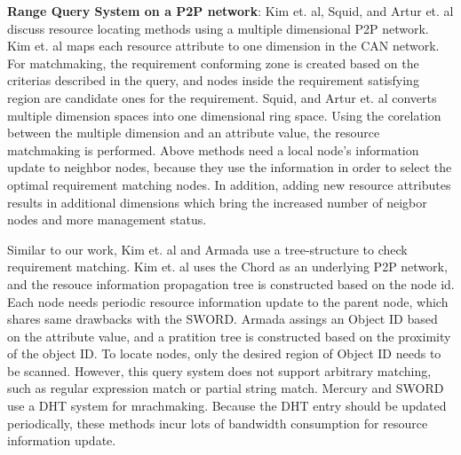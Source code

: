 \documentclass{acm_proc_article-sp}
\begin{document}
\textbf{Range Query System on a P2P network}: Kim et. al\cite{can_query}, Squid\cite{squid}, and Artur et. al\cite{query_for_grid} discuss resource locating methods using a multiple dimensional P2P network. 
Kim et. al\cite{can_query} maps each resource attribute to one dimension in the CAN network. For matchmaking, the requirement conforming zone is created based on the criterias described in the query, 
and nodes inside the requirement satisfying region are candidate ones for the requirement.
Squid\cite{squid}, and Artur et. al\cite{query_for_grid} converts multiple dimension spaces into one dimensional ring space. Using the corelation between the multiple dimension and an attribute value, 
the resource matchmaking is performed. 
Above methods need a local node's information update to neighbor nodes, because they use the information in order to select the optimal requirement matching nodes.  
In addition, adding new resource attributes results in additional dimensions which bring the increased number of neigbor nodes and more management status.

Similar to our work, Kim et. al\cite{chord_matching} and Armada\cite{armada} use a tree-structure to check requirement matching. 
Kim et. al\cite{chord_matching} uses the Chord as an underlying P2P network, and the resouce information propagation tree is
constructed based on the node id. Each node needs periodic resource information update to the parent node, which shares same drawbacks with the SWORD.
Armada\cite{armada} assings an Object ID based on the attribute value, and a pratition tree is constructed based on the proximity of the object ID. 
To locate nodes, only the desired region of Object ID needs to be scanned. However, this query system does not support arbitrary matching, such as regular expression match or partial string match.
Mercury\cite{mercury} and SWORD\cite{sword} use a DHT system for mrachmaking. 
Because the DHT entry should be updated periodically, these methods incur lots of bandwidth consumption for resource information update.
\end{document}
